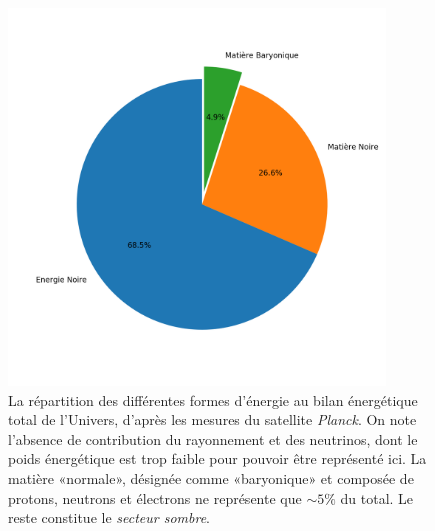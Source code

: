 \begin{figure}[htbp]
	\centering
		\includegraphics[height=10cm]{figs/pieplanck.png}
		\caption[Le bilan énergétique de l'Univers]{La répartition des différentes formes d'énergie au bilan énergétique total de l'Univers, d'après les mesures du satellite \textit{Planck}. On note l'absence de contribution du rayonnement et des neutrinos, dont le poids énergétique est trop faible pour pouvoir être représenté ici. La matière «normale», désignée comme «baryonique» et composée de protons, neutrons et électrons ne représente que $\sim 5\%$ du total. Le reste constitue le \textit{secteur sombre}.}
	\label{f:timeline}
\end{figure}


